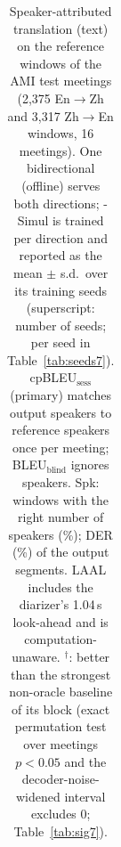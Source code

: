 \begin{table}[t]
{\begin{tabular}{lccccc@{\hskip 10pt}ccccc}
\bottomrule
\end{tabular}}
\caption{Speaker-attributed translation (text) on the reference windows of the AMI test meetings (2{,}375 En$\rightarrow$Zh and 3{,}317 Zh$\rightarrow$En windows, 16 meetings). One bidirectional \sys{} (offline) serves both directions; \sys{}-Simul is trained per direction and reported as the mean $\pm$ s.d.\ over its training seeds (superscript: number of seeds; per seed in Table~\ref{tab:seeds7}). cpBLEU$_\text{sess}$ (primary) matches output speakers to reference speakers once per meeting; BLEU$_\text{blind}$ ignores speakers. Spk: windows with the right number of speakers (\%); DER (\%) of the output segments. LAAL includes the diarizer's 1.04\,s look-ahead and is computation-unaware. $^\dagger$: better than the strongest non-oracle baseline of its block (exact permutation test over meetings $p<0.05$ and the decoder-noise-widened interval excludes 0; Table~\ref{tab:sig7}).}
\label{tab:main7}
\end{table}
